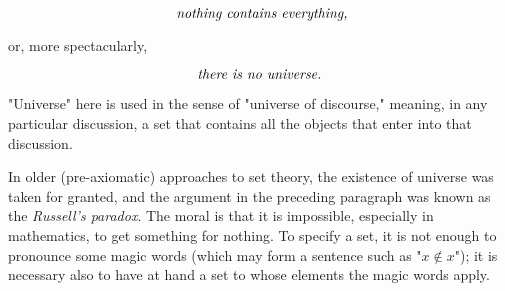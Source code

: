 \begin{equation*}
\text{ \textit{nothing contains everything,}}
\end{equation*}

or, more spectacularly,

\begin{equation*}
\text{\textit{there is no universe.}}
\end{equation*}

"Universe" here is used in the sense of "universe of discourse," meaning, in any particular discussion, a set that contains all the objects that enter into that discussion. 

In older (pre-axiomatic) approaches to set theory, the existence of universe was taken for granted, and the argument in the preceding paragraph was known as the \textit{Russell's paradox}. The moral is that it is impossible, especially in mathematics, to get something for nothing. To specify a set, it is not enough to pronounce some magic words (which may form a sentence such as "$x \notin x$"); it is necessary also to have at hand a set to whose elements the magic words apply. 
